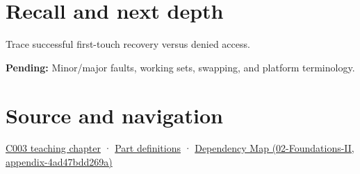 \section{Recall and next depth}\label{appendix-cc0909a7ef14-recall-and-next-depth}

Trace successful first-touch recovery versus denied access.

\textbf{Pending:} Minor/major faults, working sets, swapping, and platform terminology.

\section{Source and navigation}\label{appendix-cc0909a7ef14-source-and-navigation}

\href{Continuous\%20Notes/Computing\%20Foundations\%20-\%20From\%20Bits\%20to\%20C++\%20and\%20Systems\%20APIs\#Where\%20the\%20bytes\%20live}{C003 teaching chapter} · \hyperref[appendix-fd090d982a15-m003---parts-41-60]{Part definitions} · \href{../02-Foundations-II/main.pdf\#nameddest=appendix-4ad47bdd269a}{Dependency Map (02-Foundations-II, appendix-4ad47bdd269a)}
